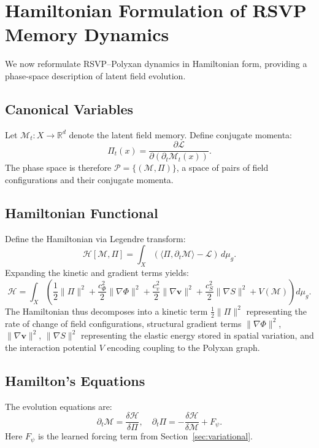 \documentclass[11pt]{article}
\begin{document}
\section{Hamiltonian Formulation of RSVP Memory Dynamics}

We now reformulate RSVP--Polyxan dynamics in Hamiltonian form, providing
a phase-space description of latent field evolution.

\subsection{Canonical Variables}

Let $\mathcal{M}_t : X \to \mathbb{R}^d$ denote the latent field memory.
Define conjugate momenta:
\[
\Pi_t(x) = \frac{\partial \mathcal{L}}{\partial (\partial_t \mathcal{M}_t(x))}.
\]
The phase space is therefore $\mathcal{P} = \{(\mathcal{M}, \Pi)\}$,
a space of pairs of field configurations and their conjugate momenta.

\subsection{Hamiltonian Functional}

Define the Hamiltonian via Legendre transform:
\[
\mathcal{H}[\mathcal{M}, \Pi]
=
\int_X
\left(
\langle \Pi, \partial_t \mathcal{M} \rangle - \mathcal{L}
\right)
\, d\mu_g.
\]
Expanding the kinetic and gradient terms yields:
\[
\mathcal{H}
=
\int_X
\left(
\frac{1}{2}\|\Pi\|^2
+
\frac{c_\Phi^2}{2}\|\nabla \Phi\|^2
+
\frac{c_v^2}{2}\|\nabla \mathbf{v}\|^2
+
\frac{c_S^2}{2}\|\nabla S\|^2
+
V(\mathcal{M})
\right)
d\mu_g.
\]
The Hamiltonian thus decomposes into a kinetic term $\frac{1}{2}\|\Pi\|^2$
representing the rate of change of field configurations, structural gradient
terms $\|\nabla\Phi\|^2$, $\|\nabla\mathbf{v}\|^2$, $\|\nabla S\|^2$
representing the elastic energy stored in spatial variation, and the
interaction potential $V$ encoding coupling to the Polyxan graph.

\subsection{Hamilton's Equations}

The evolution equations are:
\[
\partial_t \mathcal{M}
=
\frac{\delta \mathcal{H}}{\delta \Pi},
\quad
\partial_t \Pi
=
- \frac{\delta \mathcal{H}}{\delta \mathcal{M}} + F_\psi.
\]
Here $F_\psi$ is the learned forcing term from Section~\ref{sec:variational}.
\end{document}
